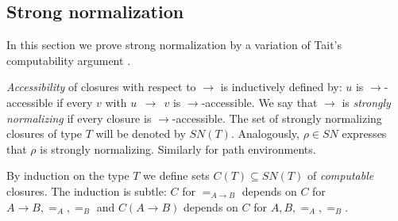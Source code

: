 \documentclass[10pt,a4paper]{article}
\newcommand{\red}{~~{\to}~~}
\newcommand{\SN}{\mathit{SN}}
\begin{document}
\subsection{Strong normalization}\label{sec:SN}
In this section we prove strong normalization by a variation of Tait's
computability argument \cite{xx}. 

\begin{definition}\label{accessible}
\emph{Accessibility} of closures with respect to $\to$ is inductively defined
by: $u$ is $\to$-accessible if every $v$ with $u\red v$ is $\to$-accessible.
We say that $\to$ is \emph{strongly normalizing} if every closure is $\to$-accessible.
The set of strongly normalizing closures of type $T$ will be denoted by $SN(T)$.
Analogously, $\rho\in\SN$ expresses that $\rho$ is strongly normalizing.
Similarly for path environments. 
\end{definition}

By induction on the type $T$ we define
sets $C(T) \subseteq \SN(T)$ of \emph{computable} closures.
The induction is subtle: $C$ for $=_{A{\to}B}$ depends on $C$ for $A{\to}B,=_A,=_B$
and $C(A{\to}B)$ depends on $C$ for $A,B,=_A,=_B$.
\end{document}
